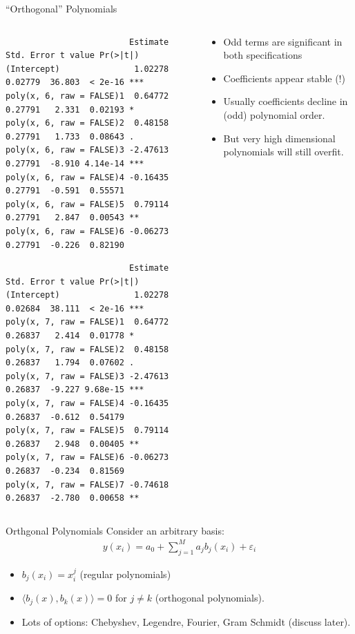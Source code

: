 \documentclass[11pt,handout,xcolor=pdftex,dvipsnames,table,mathserif,aspectratio=169]{beamer}
\begin{document}
\begin{frame}[fragile]{``Orthogonal'' Polynomials}
\begin{columns}
\begin{column}{0.6\textwidth}
\tiny
\begin{verbatim}
                         Estimate Std. Error t value Pr(>|t|)    
(Intercept)               1.02278    0.02779  36.803  < 2e-16 ***
poly(x, 6, raw = FALSE)1  0.64772    0.27791   2.331  0.02193 *  
poly(x, 6, raw = FALSE)2  0.48158    0.27791   1.733  0.08643 .  
poly(x, 6, raw = FALSE)3 -2.47613    0.27791  -8.910 4.14e-14 ***
poly(x, 6, raw = FALSE)4 -0.16435    0.27791  -0.591  0.55571    
poly(x, 6, raw = FALSE)5  0.79114    0.27791   2.847  0.00543 ** 
poly(x, 6, raw = FALSE)6 -0.06273    0.27791  -0.226  0.82190    
\end{verbatim}

\begin{verbatim}
                         Estimate Std. Error t value Pr(>|t|)    
(Intercept)               1.02278    0.02684  38.111  < 2e-16 ***
poly(x, 7, raw = FALSE)1  0.64772    0.26837   2.414  0.01778 *  
poly(x, 7, raw = FALSE)2  0.48158    0.26837   1.794  0.07602 .  
poly(x, 7, raw = FALSE)3 -2.47613    0.26837  -9.227 9.68e-15 ***
poly(x, 7, raw = FALSE)4 -0.16435    0.26837  -0.612  0.54179    
poly(x, 7, raw = FALSE)5  0.79114    0.26837   2.948  0.00405 ** 
poly(x, 7, raw = FALSE)6 -0.06273    0.26837  -0.234  0.81569    
poly(x, 7, raw = FALSE)7 -0.74618    0.26837  -2.780  0.00658 ** 
\end{verbatim}
\end{column}
\begin{column}{0.4\textwidth}
\begin{itemize}
\item Odd terms are significant in both specifications
\item Coefficients appear stable (!)
\item Usually coefficients decline in (odd) polynomial order.
\item But very high dimensional polynomials will still \alert{overfit}.
\end{itemize}
\end{column}
\end{columns}
\end{frame}

\begin{frame}{Orthgonal Polynomials}
Consider an arbitrary basis:
\begin{align*}
y(x_i) = a_0 + \sum_{j=1}^M a_j b_j(x_i) + \varepsilon_i
\end{align*}
\begin{itemize}
\item $ b_j(x_i) = x_i^j$ (regular polynomials)
\item $\langle b_j(x),b_k(x)  \rangle=0$ for $j \neq k$ (orthogonal polynomials).
\item Lots of options: Chebyshev, Legendre, Fourier, Gram Schmidt (discuss later).
\end{itemize}
\end{frame}
\end{document}
